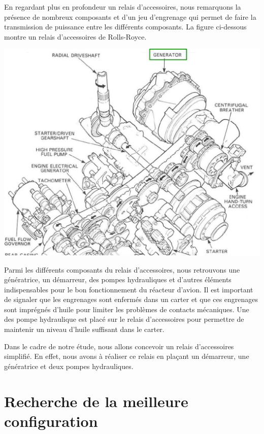 \documentclass{config}
\begin{document}
\begin{spacing}{1.2}
\newpage
En regardant plus en profondeur un relais d'accessoires, nous remarquons la présence de nombreux composants et d'un jeu d'engrenage qui permet de faire la transmission de puissance entre les différents composants. La figure ci-dessous montre un relais d'accessoires de Rolls-Royce.
\begin{center}
\includegraphics[scale=0.6]{relai_accessoires.jpg}
\end{center}

Parmi les différents composants du relais d'accessoires, nous retrouvons une génératrice, un démarreur, des pompes hydrauliques et d'autres éléments indispensables pour le bon fonctionnement du réacteur d'avion. 
Il est important de signaler que les engrenages sont enfermés dans un carter et que ces engrenages sont imprégnés d'huile pour limiter les problèmes de contacts mécaniques. Une des pompe hydraulique est placé sur le relais d'accessoires pour permettre de maintenir un niveau d'huile suffisant dans le carter.

Dans le cadre de notre étude, nous allons concevoir un relais d'accessoires simplifié. En effet, nous avons à réaliser ce relais en plaçant un démarreur, une génératrice et deux pompes hydrauliques.


\newpage
\section{Recherche de la meilleure configuration}


\end{spacing}
\end{document}
